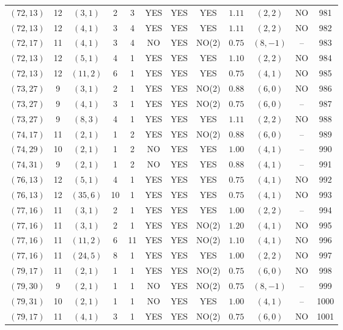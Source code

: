 \begin{longtable}{|c|c|c|c|c|c|c|c|c|c|c|c|}
$(72,13)$ & 12 & $(3,1)$ & 2 & 3 & YES & YES & YES & $1.11$ & $(2,2)$ & NO & 981\\
$(72,13)$ & 12 & $(4,1)$ & 3 & 4 & YES & YES & YES & $1.11$ & $(2,2)$ & NO & 982\\
$(72,17)$ & 11 & $(4,1)$ & 3 & 4 & NO & YES & NO(2) & $0.75$ & $(8,-1)$ & -- & 983\\
$(72,13)$ & 12 & $(5,1)$ & 4 & 1 & YES & YES & YES & $1.10$ & $(2,2)$ & NO & 984\\
$(72,13)$ & 12 & $(11,2)$ & 6 & 1 & YES & YES & YES & $0.75$ & $(4,1)$ & NO & 985\\
$(73,27)$ & 9 & $(3,1)$ & 2 & 1 & YES & YES & NO(2) & $0.88$ & $(6,0)$ & NO & 986\\
$(73,27)$ & 9 & $(4,1)$ & 3 & 1 & YES & YES & NO(2) & $0.75$ & $(6,0)$ & -- & 987\\
$(73,27)$ & 9 & $(8,3)$ & 4 & 1 & YES & YES & YES & $1.11$ & $(2,2)$ & NO & 988\\
$(74,17)$ & 11 & $(2,1)$ & 1 & 2 & YES & YES & NO(2) & $0.88$ & $(6,0)$ & -- & 989\\
$(74,29)$ & 10 & $(2,1)$ & 1 & 2 & NO & YES & YES & $1.00$ & $(4,1)$ & -- & 990\\
$(74,31)$ & 9 & $(2,1)$ & 1 & 2 & NO & YES & YES & $0.88$ & $(4,1)$ & -- & 991\\
$(76,13)$ & 12 & $(5,1)$ & 4 & 1 & YES & YES & YES & $0.75$ & $(4,1)$ & NO & 992\\
$(76,13)$ & 12 & $(35,6)$ & 10 & 1 & YES & YES & YES & $0.75$ & $(4,1)$ & NO & 993\\
$(77,16)$ & 11 & $(3,1)$ & 2 & 1 & YES & YES & YES & $1.00$ & $(2,2)$ & -- & 994\\
$(77,16)$ & 11 & $(3,1)$ & 2 & 1 & YES & YES & NO(2) & $1.20$ & $(4,1)$ & NO & 995\\
$(77,16)$ & 11 & $(11,2)$ & 6 & 11 & YES & YES & NO(2) & $1.10$ & $(4,1)$ & NO & 996\\
$(77,16)$ & 11 & $(24,5)$ & 8 & 1 & YES & YES & YES & $1.00$ & $(2,2)$ & NO & 997\\
$(79,17)$ & 11 & $(2,1)$ & 1 & 1 & YES & YES & NO(2) & $0.75$ & $(6,0)$ & NO & 998\\
$(79,30)$ & 9 & $(2,1)$ & 1 & 1 & NO & YES & NO(2) & $0.75$ & $(8,-1)$ & -- & 999\\
$(79,31)$ & 10 & $(2,1)$ & 1 & 1 & NO & YES & YES & $1.00$ & $(4,1)$ & -- & 1000\\
$(79,17)$ & 11 & $(4,1)$ & 3 & 1 & YES & YES & NO(2) & $0.75$ & $(6,0)$ & NO & 1001\\

\end{longtable}
